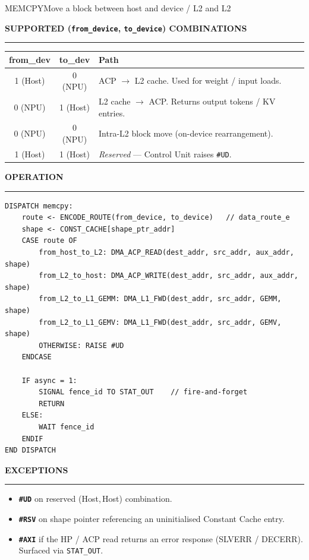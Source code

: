 \documentclass[11pt,a4paper,twoside,openany]{report}
\newcommand{\RefSection}[1]{%
  \par\medskip
  {\sffamily\bfseries\color{oceanblue}\normalsize\MakeUppercase{#1}}
  \par\vspace{-0.4em}
  {\color{oceanblue}\rule{\linewidth}{0.4pt}}\par\smallskip
}
\begin{document}
\begin{InstructionRef}{MEMCPY}{Move a block between host and device / L2 and L2}
\RefSection{Supported (\texttt{from\_device}, \texttt{to\_device}) combinations}

\begin{tabularx}{\linewidth}{|c|c|X|}
\hline
\rowcolor{skytint}
\textbf{from\_dev} & \textbf{to\_dev} & \textbf{Path} \\
\hline
1 (Host) & 0 (NPU)  & ACP $\to$ L2 cache. Used for weight / input loads. \\
\hline
0 (NPU)  & 1 (Host) & L2 cache $\to$ ACP. Returns output tokens / KV entries. \\
\hline
0 (NPU)  & 0 (NPU)  & Intra-L2 block move (on-device rearrangement). \\
\hline
1 (Host) & 1 (Host) & \textit{Reserved} --- Control Unit raises \texttt{\#UD}. \\
\hline
\end{tabularx}

\RefSection{Operation}

\begin{lstlisting}[style=pseudo]
DISPATCH memcpy:
    route <- ENCODE_ROUTE(from_device, to_device)   // data_route_e
    shape <- CONST_CACHE[shape_ptr_addr]
    CASE route OF
        from_host_to_L2: DMA_ACP_READ(dest_addr, src_addr, aux_addr, shape)
        from_L2_to_host: DMA_ACP_WRITE(dest_addr, src_addr, aux_addr, shape)
        from_L2_to_L1_GEMM: DMA_L1_FWD(dest_addr, src_addr, GEMM, shape)
        from_L2_to_L1_GEMV: DMA_L1_FWD(dest_addr, src_addr, GEMV, shape)
        OTHERWISE: RAISE #UD
    ENDCASE

    IF async = 1:
        SIGNAL fence_id TO STAT_OUT    // fire-and-forget
        RETURN
    ELSE:
        WAIT fence_id
    ENDIF
END DISPATCH
\end{lstlisting}

\RefSection{Exceptions}

\begin{itemize}[leftmargin=*, itemsep=0.2ex]
  \item \textbf{\texttt{\#UD}} on reserved (Host,\,Host) combination.
  \item \textbf{\texttt{\#RSV}} on shape pointer referencing an
        uninitialised Constant Cache entry.
  \item \textbf{\texttt{\#AXI}} if the HP / ACP read returns an
        error response (SLVERR / DECERR). Surfaced via
        \texttt{STAT\_OUT}.
\end{itemize}
\end{InstructionRef}
\end{document}
